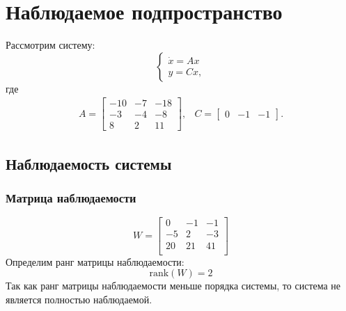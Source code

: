\section{Наблюдаемое подпространство}

Рассмотрим систему: 
\begin{equation}
    \begin{cases}
        \dot{x} = Ax \\
        y = Cx,
    \end{cases}
\end{equation}
где 
\begin{equation}
    \begin{array}{cc}
        A = \begin{bmatrix}
            -10 & -7 & -18 \\
            -3 & -4 & -8 \\
            8 & 2 & 11
        \end{bmatrix}, &
        C = \begin{bmatrix}
            0 & -1 & -1
        \end{bmatrix}.
    \end{array}
\end{equation}

\subsection{Наблюдаемость системы}
\subsubsection{Матрица наблюдаемости}
\begin{equation}
    W = \begin{bmatrix}
        0  & -1  & -1 \\ 
        -5  & 2  & -3 \\ 
        20  & 21  & 41 \\ 
        \end{bmatrix}
\end{equation}
Определим ранг матрицы наблюдаемости:
\begin{equation}
    \text{rank}(W) = 2
\end{equation}
Так как ранг матрицы наблюдаемости меньше порядка системы, то система не является полностью наблюдаемой. 

